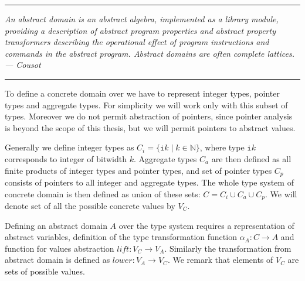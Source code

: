 \bigskip

\hrule

\bigskip
\noindent
\textit{An abstract domain is an abstract algebra, implemented as a library module,
providing a description of abstract program properties and abstract property
transformers describing the operational effect of program instructions and
commands in the abstract program. Abstract domains are often complete lattices. --- Cousot \cite{Cousot79} }
\bigskip

\hrule

\bigskip

To define a concrete domain over \LLVM we have to represent integer types,
pointer types and aggregate types. For simplicity we will work only with this
subset of \LLVM types. Moreover we do not permit abstraction of pointers, since
pointer analysis is beyond the scope of this thesis, but we will permit
pointers to abstract values.

Generally we define integer types as $C_{i} = \{ \texttt{i}k \mid k
\in \mathbb{N} \}$, where type $\texttt{i}k$ corresponds to integer of bitwidth $k$.
Aggregate types $C_a$ are then defined as all finite products of integer types and
pointer types, and set of pointer types $C_p$ consists of pointers to all integer
and aggregate types. The whole type system of concrete domain is
then defined as union of these sets: $C = C_i \cup C_a \cup C_p$. We will denote
set of all the possible concrete values by $V_C$.

Defining an abstract domain $A$ over the \LLVM type system requires a representation of
abstract variables, definition of the type transformation function $\alpha_A \colon C \to A$
and function for values abstraction $\textit{lift} \colon V_C \to V_A$.
Similarly the transformation from abstract domain is defined as
$\textit{lower} \colon V_A \to {V_C}$. We remark that elements of $V_C$
are sets of possible values.

%
%

